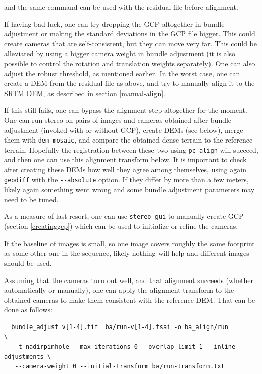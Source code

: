 and the same command can be used with the residual file before alignment.

If having bad luck, one can try dropping the GCP altogether in bundle
adjustment or making the standard deviations in the GCP file
bigger. This could create cameras that are self-consistent, but they can
move very far. This could be alleviated by using a bigger camera weight
in bundle adjustment (it is also possible to control the rotation and
translation weights separately). One can also adjust the robust
threshold, as mentioned earlier.  In the worst case, one can create a
DEM from the residual file as above, and try to manually align it to the
SRTM DEM, as described in section \ref{manual-align}.

If this still fails, one can bypass the alignment step altogether for
the moment. One can run stereo on pairs of images and cameras obtained
after bundle adjustment (invoked with or without GCP), create DEMs (see
below), merge them with \texttt{dem\_mosaic}, and compare the obtained
dense terrain to the reference terrain. Hopefully the registration
between these two using \texttt{pc\_align} will succeed, and then one
can use this alignment transform below. It is important to check after
creating these DEMs how well they agree among themselves, using again
\texttt{geodiff} with the \texttt{-\/-absolute} option. If they differ
by more than a few meters, likely again something went wrong and some
bundle adjustment parameters may need to be tuned. 

As a measure of last resort, one can use \texttt{stereo\_gui} to manually
create GCP (section \ref{creatinggcp}) which can be used to initialize
or refine the cameras.

If the baseline of images is small, so one image covers roughly the same
footprint as some other one in the sequence, likely nothing will help
and different images should be used.

Assuming that the cameras turn out well, and that alignment succeeds
(whether automatically or manually), one can apply the alignment
transform to the obtained cameras to make them consistent with the
reference DEM. That can be done as follows:

\begin{verbatim}
  bundle_adjust v[1-4].tif  ba/run-v[1-4].tsai -o ba_align/run               \
   -t nadirpinhole --max-iterations 0 --overlap-limit 1 --inline-adjustments \
   --camera-weight 0 --initial-transform ba/run-transform.txt
\end{verbatim}

